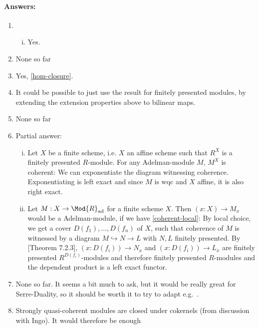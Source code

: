 \paragraph{Answers:}
\begin{enumerate}
\item \begin{enumerate}[(i)]
\item Yes.
\end{enumerate}
\item None so far
\item Yes, \cref{hom-closure}.
\item It could be possible to just use the result for finitely presented modules, by extending the extension properties above to bilinear maps.
\item None so far
\item Partial answer:
\begin{enumerate}[(i)]
\item Let $X$ be a finite scheme, i.e. $X$ an affine scheme such that $R^X$ is a finitely presented $R$-module.
  For any Adelman-module $M$, $M^X$ is coherent: We can exponentiate the diagram witnessing coherence.
  Exponentiating is left exact and since $M$ is wqc and $X$ affine, it is also right exact.
\item Let $M:X\to \Mod{R}_{\mathrm{ad}}$ for a finite scheme $X$. Then $(x:X)\to M_x$ would be a Adelman-module, if we have \cref{coherent-local}: By local choice, we get a cover $D(f_1),\dots,D(f_n)$ of $X$, such that coherence of $M$ is witnessed by a diagram $M\hookrightarrow N \to L$ with $N,L$ finitely presented. By \cite{draft}[Theorem 7.2.3], $(x:D(f_i))\to N_x$ and $(x:D(f_i))\to L_x$ are finitely presented $R^{D(f_i)}$-modules and therefore finitely presented $R$-modules and the dependent product is a left exact functor.
\end{enumerate}
\item None so far. It seems a bit much to ask, but it would be really great for Serre-Duality, so it should be worth it to try to adapt e.g.\ \cite[19.1.3]{vakil}.
\item Strongly quasi-coherent modules are closed under cokernels (from discussion with Ingo). It would therefore be enough
\end{enumerate}
